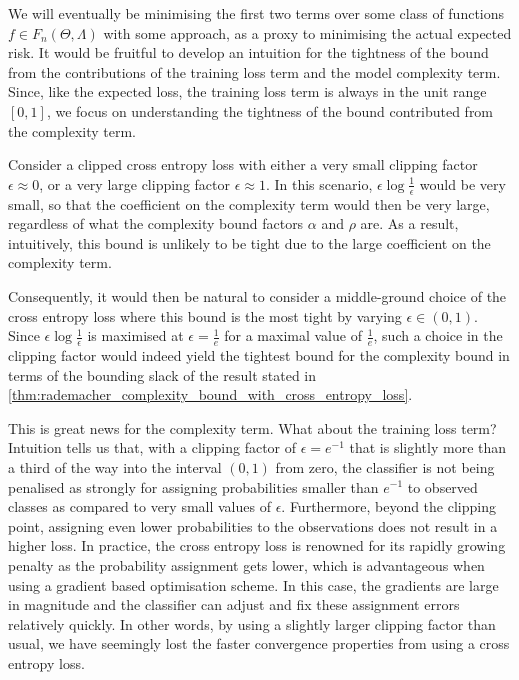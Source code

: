 \documentclass{article}
\numberwithin{equation}{section}
\numberwithin{table}{section}
\numberwithin{algorithm}{section}
\begin{document}
		We will eventually be minimising the first two terms over some class of functions $f \in F_{n}(\Theta, \Lambda)$ with some approach, as a proxy to minimising the actual expected risk. It would be fruitful to develop an intuition for the tightness of the bound from the contributions of the training loss term and the model complexity term. Since, like the expected loss, the training loss term is always in the unit range $[0, 1]$, we focus on understanding the tightness of the bound contributed from the complexity term.
		
		Consider a clipped cross entropy loss with either a very small clipping factor $\epsilon \approx 0$, or a very large clipping factor $\epsilon \approx 1$. In this scenario, $\epsilon \log{\frac{1}{\epsilon}}$ would be very small, so that the coefficient on the complexity term would then be very large, regardless of what the complexity bound factors $\alpha$ and $\rho$ are. As a result, intuitively, this bound is unlikely to be tight due to the large coefficient on the complexity term.
		
		Consequently, it would then be natural to consider a middle-ground choice of the cross entropy loss where this bound is the most tight by varying $\epsilon \in (0, 1)$. Since $\epsilon \log{\frac{1}{\epsilon}}$ is maximised at $\epsilon = \frac{1}{e}$ for a maximal value of $\frac{1}{e}$, such a choice in the clipping factor would indeed yield the tightest bound for the complexity bound in terms of the bounding slack of the result stated in \cref{thm:rademacher_complexity_bound_with_cross_entropy_loss}.
	 
		This is great news for the complexity term. What about the training loss term? Intuition tells us that, with a clipping factor of $\epsilon = e^{-1}$ that is slightly more than a third of the way into the interval $(0, 1)$ from zero, the classifier is not being penalised as strongly for assigning probabilities smaller than $e^{-1}$ to observed classes as compared to very small values of $\epsilon$. Furthermore, beyond the clipping point, assigning even lower probabilities to the observations does not result in a higher loss. In practice, the cross entropy loss is renowned for its rapidly growing penalty as the probability assignment gets lower, which is advantageous when using a gradient based optimisation scheme. In this case, the gradients are large in magnitude and the classifier can adjust and fix these assignment errors relatively quickly. In other words, by using a slightly larger clipping factor than usual, we have seemingly lost the faster convergence properties from using a cross entropy loss.
		
\end{document}
